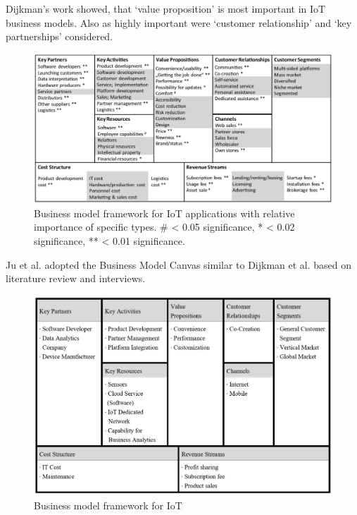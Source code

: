 Dijkman's work showed, that `value proposition' is most important in IoT business models. Also as highly important were `customer relationship' and `key  partnerships' considered. 

  \begin{figure}[h]
    \begin{center}
    \includegraphics[scale=0.52]{Talk11/iot_canvas_rel_imp_dijkman.jpg}
    \end{center}
    \caption{  Business model framework for IoT applications with relative importance of specific types. # < 0.05 significance, * < 0.02 significance, **  < 0.01 significance.}
    \label{ Business model for IoT}
  \end{figure}

Ju et al. adopted the Business Model Canvas similar to Dijkman et al. based on literature review and interviews.


  \begin{figure}[h]
    \begin{center}
    \includegraphics[scale=0.7]{Talk11/iot_canvas_ju.jpg}
    \end{center}
    \caption{  Business model framework for IoT }
    \label{ Business model for IoT Ju}
  \end{figure}



